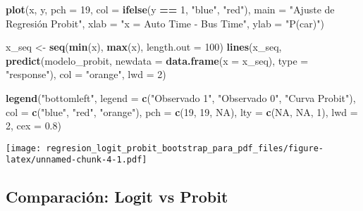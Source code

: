 \documentclass[
]{article}
\newenvironment{Shaded}{\begin{snugshade}}{\end{snugshade}}
\newcommand{\AttributeTok}[1]{\textcolor[rgb]{0.13,0.29,0.53}{#1}}
\newcommand{\ConstantTok}[1]{\textcolor[rgb]{0.56,0.35,0.01}{#1}}
\newcommand{\DecValTok}[1]{\textcolor[rgb]{0.00,0.00,0.81}{#1}}
\newcommand{\FloatTok}[1]{\textcolor[rgb]{0.00,0.00,0.81}{#1}}
\newcommand{\FunctionTok}[1]{\textcolor[rgb]{0.13,0.29,0.53}{\textbf{#1}}}
\newcommand{\NormalTok}[1]{#1}
\newcommand{\OtherTok}[1]{\textcolor[rgb]{0.56,0.35,0.01}{#1}}
\newcommand{\SpecialCharTok}[1]{\textcolor[rgb]{0.81,0.36,0.00}{\textbf{#1}}}
\newcommand{\StringTok}[1]{\textcolor[rgb]{0.31,0.60,0.02}{#1}}
\begin{document}
\begin{Shaded}
\begin{Highlighting}[]
\FunctionTok{plot}\NormalTok{(x, y, }\AttributeTok{pch =} \DecValTok{19}\NormalTok{, }\AttributeTok{col =} \FunctionTok{ifelse}\NormalTok{(y }\SpecialCharTok{==} \DecValTok{1}\NormalTok{, }\StringTok{"blue"}\NormalTok{, }\StringTok{"red"}\NormalTok{),}
     \AttributeTok{main =} \StringTok{"Ajuste de Regresión Probit"}\NormalTok{, }\AttributeTok{xlab =} \StringTok{"x = Auto Time {-} Bus Time"}\NormalTok{, }\AttributeTok{ylab =} \StringTok{"P(car)"}\NormalTok{)}

\NormalTok{x\_seq }\OtherTok{\textless{}{-}} \FunctionTok{seq}\NormalTok{(}\FunctionTok{min}\NormalTok{(x), }\FunctionTok{max}\NormalTok{(x), }\AttributeTok{length.out =} \DecValTok{100}\NormalTok{)}
\FunctionTok{lines}\NormalTok{(x\_seq, }\FunctionTok{predict}\NormalTok{(modelo\_probit, }\AttributeTok{newdata =} \FunctionTok{data.frame}\NormalTok{(}\AttributeTok{x =}\NormalTok{ x\_seq), }\AttributeTok{type =} \StringTok{"response"}\NormalTok{),}
      \AttributeTok{col =} \StringTok{"orange"}\NormalTok{, }\AttributeTok{lwd =} \DecValTok{2}\NormalTok{)}

\FunctionTok{legend}\NormalTok{(}\StringTok{"bottomleft"}\NormalTok{, }\AttributeTok{legend =} \FunctionTok{c}\NormalTok{(}\StringTok{"Observado 1"}\NormalTok{, }\StringTok{"Observado 0"}\NormalTok{, }\StringTok{"Curva Probit"}\NormalTok{),}
       \AttributeTok{col =} \FunctionTok{c}\NormalTok{(}\StringTok{"blue"}\NormalTok{, }\StringTok{"red"}\NormalTok{, }\StringTok{"orange"}\NormalTok{), }\AttributeTok{pch =} \FunctionTok{c}\NormalTok{(}\DecValTok{19}\NormalTok{, }\DecValTok{19}\NormalTok{, }\ConstantTok{NA}\NormalTok{), }\AttributeTok{lty =} \FunctionTok{c}\NormalTok{(}\ConstantTok{NA}\NormalTok{, }\ConstantTok{NA}\NormalTok{, }\DecValTok{1}\NormalTok{), }\AttributeTok{lwd =} \DecValTok{2}\NormalTok{, }\AttributeTok{cex =} \FloatTok{0.8}\NormalTok{)}
\end{Highlighting}
\end{Shaded}

\texttt{[image: regresion\_logit\_probit\_bootstrap\_para\_pdf\_files/figure-latex/unnamed-chunk-4-1.pdf]}

\subsection{Comparación: Logit vs
Probit}\label{comparaciuxf3n-logit-vs-probit}
\end{document}
